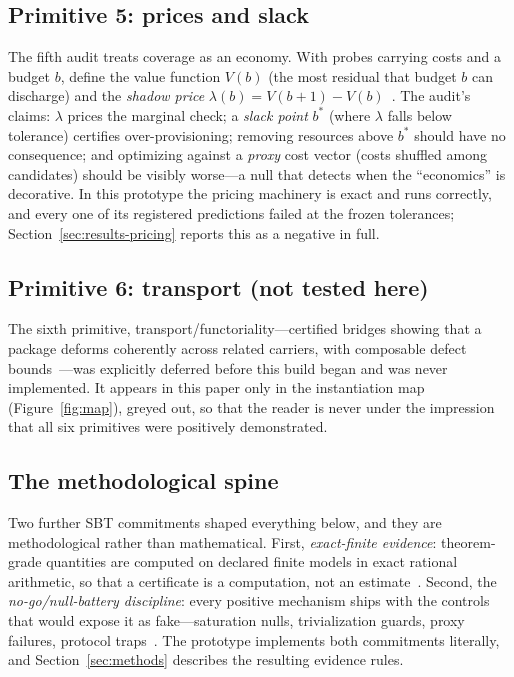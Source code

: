 \documentclass[11pt]{article}
\theoremstyle{definition}
\begin{document}
\subsection{Primitive 5: prices and slack}
\label{sec:sbt-prices}

The fifth audit treats coverage as an economy. With probes carrying costs and a budget $b$, define the value function $V(b)$ (the most residual that budget $b$ can discharge) and the \emph{shadow price} $\lambda(b) = V(b{+}1) - V(b)$~\cite{sbt-spend}. The audit's claims: $\lambda$ prices the marginal check; a \emph{slack point} $b^{*}$ (where $\lambda$ falls below tolerance) certifies over-provisioning; removing resources above $b^{*}$ should have no consequence; and optimizing against a \emph{proxy} cost vector (costs shuffled among candidates) should be visibly worse---a null that detects when the ``economics'' is decorative. In this prototype the pricing machinery is exact and runs correctly, and every one of its registered predictions failed at the frozen tolerances; Section~\ref{sec:results-pricing} reports this as a negative in full.

\subsection{Primitive 6: transport (not tested here)}
\label{sec:sbt-transport}

The sixth primitive, transport/functoriality---certified bridges showing that a package deforms coherently across related carriers, with composable defect bounds~\cite{sbt-nk}---was explicitly deferred before this build began and was never implemented. It appears in this paper only in the instantiation map (Figure~\ref{fig:map}), greyed out, so that the reader is never under the impression that all six primitives were positively demonstrated.

\subsection{The methodological spine}
\label{sec:sbt-method}

Two further SBT commitments shaped everything below, and they are methodological rather than mathematical. First, \emph{exact-finite evidence}: theorem-grade quantities are computed on declared finite models in exact rational arithmetic, so that a certificate is a computation, not an estimate~\cite{sbt-f3}. Second, the \emph{no-go/null-battery discipline}: every positive mechanism ships with the controls that would expose it as fake---saturation nulls, trivialization guards, proxy failures, protocol traps~\cite{sbt-ng}. The prototype implements both commitments literally, and Section~\ref{sec:methods} describes the resulting evidence rules.
\end{document}
